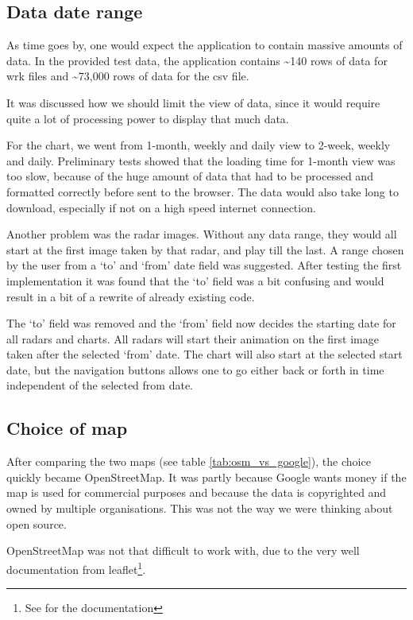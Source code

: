 \subsection{Data date range}
\label{sec:data_date_range}
As time goes by, one would expect the application to contain massive amounts of data.
In the provided test data, the application contains \textasciitilde 140 rows of data for \textsf{wrk} files and \textasciitilde 73,000 rows of data for the \textsf{csv} file.

It was discussed how we should limit the view of data, since it would require quite a lot of processing power to display that much data.

For the chart, we went from 1-month, weekly and daily view to 2-week, weekly and daily.
Preliminary tests showed that the loading time for 1-month view was too slow, because of the huge amount of data that had to be processed and formatted correctly before sent to the browser. The data would also take long to download, especially if not on a high speed internet connection.

Another problem was the radar images. Without any data range, they would all start at the first image taken by that radar, and play till the last. A range chosen by the user from a `to' and `from' date field was suggested. After testing the first implementation it was found that the `to' field was a bit confusing and would result in a bit of a rewrite of already existing code.

The `to' field was removed and the `from' field now decides the starting date for all radars and charts.
All radars will start their animation on the first image taken after the selected `from' date.
The chart will also start at the selected start date, but the navigation buttons allows one to go either back or forth in time independent of the selected from date.

\subsection{Choice of map}
\label{sec:implementation_choice_of_map}
After comparing the two maps (see table \ref{tab:osm_vs_google}), the choice quickly became OpenStreetMap. It was partly because Google wants money if the map is used for commercial purposes and because the data is copyrighted and owned by multiple organisations. This was not the way we were thinking about open source.

OpenStreetMap was not that difficult to work with, due to the very well documentation from leaflet\footnote{See \cite{leaflet} for the documentation}.

